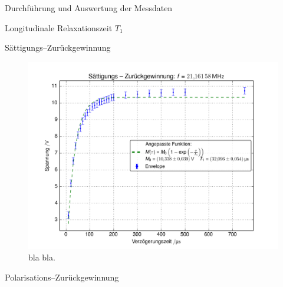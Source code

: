 \documentclass[pdftex, a4paper,11pt, twoside, ngerman]{report}
\begin{document}
\begin{chapter}{Durchführung und Auswertung der Messdaten}
\begin{section}{
        Longitudinale Relaxationszeit $T_{1}$}
\begin{subsection}{Sättigungs--Zurückgewinnung}
        
        
        
        \begin{figure}[htb]
          \centering
          \includegraphics[width=\textwidth]
          {Figures/SaettigungsZurueckgewinnung.png}
          \caption{bla bla.}
          \label{figSaettigung}
        \end{figure}
        
        
      \end{subsection}
      
      
      \newpage
      \begin{subsection}{Polarisations--Zurückgewinnung}
        \label{chpLongRelaxPolarisation}
        
        
        

\end{subsection}
\end{section}
\end{chapter}
\end{document}
